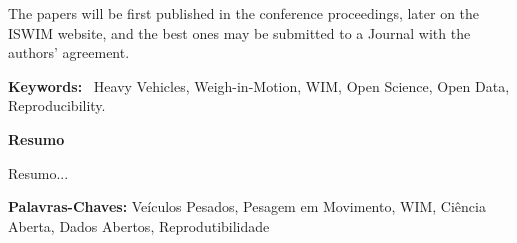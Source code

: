 \documentclass[a4paper]{article}
\newcommand\textstyletablecaptionCar[1]{\foreignlanguage{english}{\textbf{#1}}}
\begin{document}
\bigskip

{
The papers will be first published in the conference proceedings, later
on the ISWIM website, and the best ones may be submitted to a Journal
with the authors' agreement.}


\bigskip

{
\textstyletablecaptionCar{Keywords:} \ Heavy
Vehicles, Weigh-in-Motion, WIM, Open Science, Open Data, Reproducibility.}


\bigskip

{\bfseries
\foreignlanguage{portuguese}{Resumo}}

{
\foreignlanguage{portuguese}{
Resumo...
}}


\bigskip

{
\textstyletablecaptionCar{\foreignlanguage{portuguese}{Palavras-Chaves:}}\foreignlanguage{portuguese}{
Veículos Pesados, Pesagem em Movimento, WIM, Ciência Aberta, Dados Abertos, Reprodutibilidade}}
\end{document}
